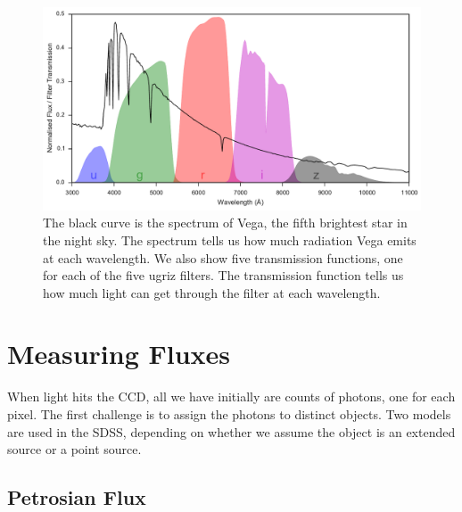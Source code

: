 \begin{figure}[tbp]
	\centering \includegraphics[width=\textwidth]{figures/2_astro/vega_filters_and_spectrum}
	\caption[Spectrum of the star Vega and the ugriz bandpasses]{The black curve is the
		spectrum of Vega, the fifth brightest star in the night sky. The spectrum tells us how
		much radiation Vega emits at each wavelength. We also show five transmission functions,
		one for each of the five ugriz filters. The transmission function tells us how much light
		can get through the filter at each wavelength.} \label{fig:vega} 
\end{figure}


\section{Measuring Fluxes} 
\label{sec:flux}

When light hits the CCD, all we have initially are counts of photons, one for each pixel.
The first challenge is to assign the photons to distinct objects. Two models are used
in the SDSS, depending on whether we assume the object is an extended source or a point source.


\subsection{Petrosian Flux} 
\label{sub:petrosian}

